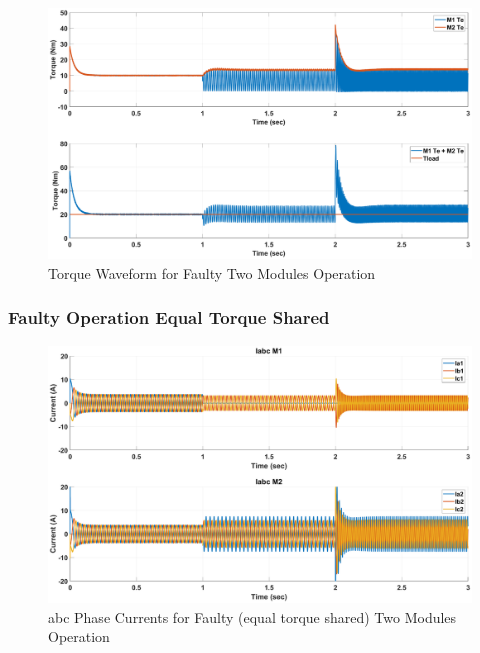 \documentclass{article}
\begin{document}
\begin{figure}[H]
\centering
\includegraphics[scale=0.35]{SimulationResults/two_modules/faulty/tref_tload.eps}
\caption{Torque Waveform for Faulty Two Modules Operation}
\label{fig:TorqueTwoModulesFaulty}
\end{figure}

\subsubsection{Faulty Operation Equal Torque Shared}

\begin{figure}[H]
\centering
\includegraphics[scale=0.35]{SimulationResults/two_modules/faulty_torqueshared/Iabc.eps}
\caption{abc Phase Currents for Faulty (equal torque shared) Two Modules Operation}
\label{fig:PhaseCurrentsAbcTwoModulesFaultyEqualTorque}
\end{figure}
\end{document}
